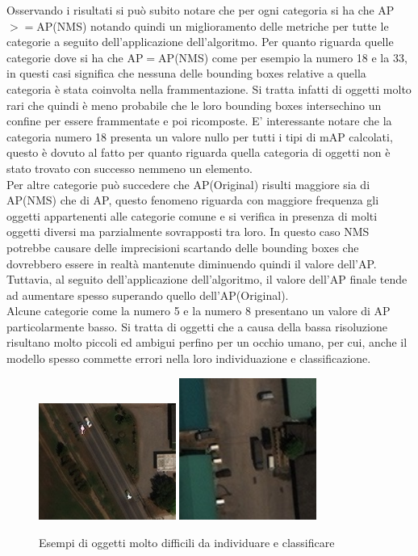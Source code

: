 Osservando i risultati si può subito notare che per ogni categoria si ha che AP$>=$AP(NMS) notando quindi un miglioramento delle metriche per tutte le categorie a seguito dell'applicazione dell'algoritmo. Per quanto riguarda quelle categorie dove si ha che AP$=$AP(NMS) come per esempio la numero 18 e la 33, in questi casi significa che nessuna delle bounding boxes relative a quella categoria è stata coinvolta nella frammentazione. Si tratta infatti di oggetti molto rari che quindi è meno probabile che le loro bounding boxes intersechino un confine per essere frammentate e poi ricomposte. E' interessante notare che la categoria numero 18 presenta un valore nullo per tutti i tipi di mAP calcolati, questo è dovuto al fatto per quanto riguarda quella categoria di oggetti non è stato trovato con successo nemmeno un elemento. \\
Per altre categorie può succedere che AP(Original) risulti maggiore sia di AP(NMS) che di AP, questo fenomeno riguarda con maggiore frequenza gli oggetti appartenenti alle categorie comune e si verifica in presenza di molti oggetti diversi ma parzialmente sovrapposti tra loro. In questo caso NMS potrebbe causare delle imprecisioni scartando delle bounding boxes che dovrebbero essere in realtà mantenute diminuendo quindi il valore dell'AP. Tuttavia, al seguito dell'applicazione dell'algoritmo, il valore dell'AP finale tende ad aumentare spesso superando quello dell'AP(Original).\\
Alcune categorie come la numero 5 e la numero 8 presentano un valore di AP particolarmente basso. Si tratta di oggetti che a causa della bassa risoluzione risultano molto piccoli ed ambigui perfino per un occhio umano, per cui, anche il modello spesso commette errori nella loro individuazione e classificazione.\\
\begin{figure}
\begin{center}
\includegraphics[width=0.4\textwidth, height=0.25\textheight]{images/auto1-satellite.jpg}
\includegraphics[width=0.4\textwidth, height=0.25\textheight]{images/auto2-satellite.jpg}
\end{center}
\caption{Esempi di oggetti molto difficili da individuare e classificare}
\end{figure}
